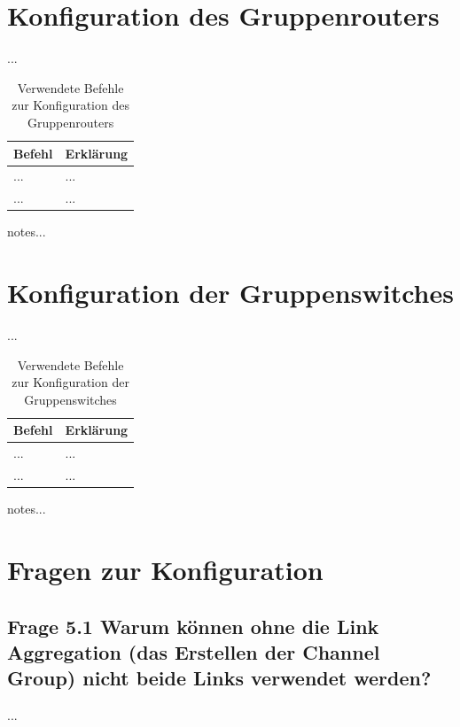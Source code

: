 \documentclass{article}
\begin{document}
\pagebreak



\section{Konfiguration des Gruppenrouters}

...\\

\begin{table}[htbp]
    \centering
    \begin{tabularx}{\textwidth}{|X|X|}
        \toprule
        \textbf{Befehl} & \textbf{Erklärung} \\
        \midrule
        ... & ...\\
        \hline
        ... & ...\\
        \bottomrule
    \end{tabularx}
    \caption{Verwendete Befehle zur Konfiguration des Gruppenrouters}
\end{table}

\noindent notes...



\section{Konfiguration der Gruppenswitches}

...\\

\begin{table}[htbp]
    \centering
    \begin{tabularx}{\textwidth}{|X|X|}
        \toprule
        \textbf{Befehl} & \textbf{Erklärung} \\
        \midrule
        ... & ...\\
        \hline
        ... & ...\\
        \bottomrule
    \end{tabularx}
    \caption{Verwendete Befehle zur Konfiguration der Gruppenswitches}
    \label{tab:commands}
\end{table}
\noindent notes...

\section{Fragen zur Konfiguration}

\subsection*{Frage 5.1 \normalfont Warum können ohne die Link Aggregation (das Erstellen der Channel Group) nicht beide Links verwendet werden?}
...\\
\end{document}
